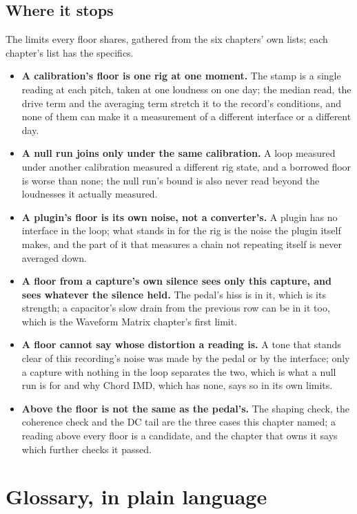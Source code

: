 \documentclass[11pt,a4paper]{article}
\begin{document}
\subsection{Where it stops}

The limits every floor shares, gathered from the six chapters' own
lists; each chapter's list has the specifics.

\begin{itemize}
  \item \textbf{A calibration's floor is one rig at one moment.} The
  stamp is a single reading at each pitch, taken at one loudness on one
  day; the median read, the drive term and the averaging term stretch it
  to the record's conditions, and none of them can make it a measurement
  of a different interface or a different day.
  \item \textbf{A null run joins only under the same calibration.} A loop
  measured under another calibration measured a different rig state, and
  a borrowed floor is worse than none; the null run's bound is also never
  read beyond the loudnesses it actually measured.
  \item \textbf{A plugin's floor is its own noise, not a converter's.} A
  plugin has no interface in the loop; what stands in for the rig is the
  noise the plugin itself makes, and the part of it that measures a chain
  not repeating itself is never averaged down.
  \item \textbf{A floor from a capture's own silence sees only this
  capture, and sees whatever the silence held.} The pedal's hiss is in
  it, which is its strength; a capacitor's slow drain from the previous
  row can be in it too, which is the Waveform Matrix chapter's first
  limit.
  \item \textbf{A floor cannot say whose distortion a reading is.} A tone
  that stands clear of this recording's noise was made by the pedal or by
  the interface; only a capture with nothing in the loop separates the
  two, which is what a null run is for and why Chord IMD, which has none,
  says so in its own limits.
  \item \textbf{Above the floor is not the same as the pedal's.} The
  shaping check, the coherence check and the DC tail are the three cases
  this chapter named; a reading above every floor is a candidate, and the
  chapter that owns it says which further checks it passed.
\end{itemize}

\clearpage

\section{Glossary, in plain language}



\end{document}
